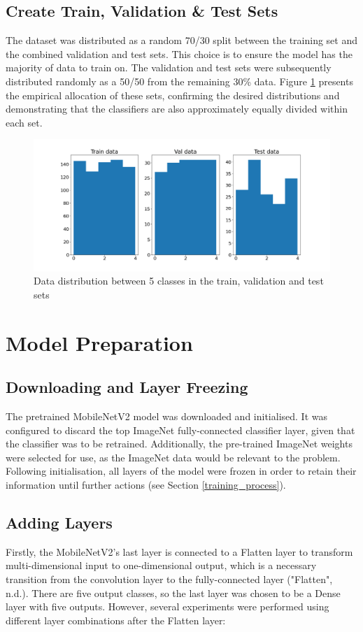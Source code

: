 \documentclass[]{article}
\begin{document}
\subsection{Create Train, Validation \& Test Sets}
The dataset was distributed as a random 70/30 split between the training set and the combined validation and test sets. This choice is to ensure the model has the majority of data to train on. The validation and test sets were subsequently distributed randomly as a 50/50 from the remaining 30\% data. Figure \ref{fig:DataDistribution} presents the empirical allocation of these sets, confirming the desired distributions and demonstrating that the classifiers are also approximately equally divided within each set.

\begin{figure}[H]
  \includegraphics[scale=.25]{DataDistribution.png}
  \centering
  \caption{Data distribution between 5 classes in the train, validation and test sets}
  \label{fig:DataDistribution}
\end{figure}

\section{Model Preparation}
\subsection{Downloading and Layer Freezing}
The pretrained MobileNetV2 model was downloaded and initialised. It was configured to discard the top ImageNet fully-connected classifier layer, given that the classifier was to be retrained. Additionally, the pre-trained ImageNet weights were selected for use, as the ImageNet data would be relevant to the problem. Following initialisation, all layers of the model were frozen in order to retain their information until further actions (see Section \ref{training_process}). 

\subsection{Adding Layers}
Firstly, the MobileNetV2's last layer is connected to a Flatten layer to transform multi-dimensional input to one-dimensional output, which is a necessary transition from the convolution layer to the fully-connected layer ("Flatten", n.d.). There are five output classes, so the last layer was chosen to be a Dense layer with five outputs. However, several experiments were performed using different layer combinations after the Flatten layer:
\end{document}
